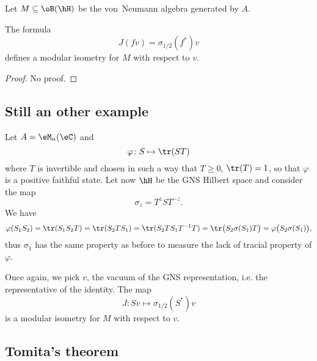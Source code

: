 Let $M\subseteq\oB(\hH)$ be the von~Neumann algebra generated by $A$.
\begin{proposition}
	The formula
	\begin{equation}
		J(fv)=\sigma_{1/2}(f^*)v
	\end{equation}
	defines a modular isometry for $M$ with respect to $v$.
\end{proposition}

\begin{proof}
No proof.
\end{proof}

					\subsection{Still an other example}

Let $A=\eM_n(\eC)$ and
\begin{equation}
	\varphi\colon S\mapsto \tr(ST)
\end{equation}
where $T$ is invertible and chosen in such a way that $T\geq0$, $\tr(T)=1$, so that $\varphi$ is a positive faithful state. Let now $\hH$ be the GNS Hilbert space and consider the map
\begin{equation}
	\sigma_z=T^zST^{-z}.
\end{equation}
We have
\begin{equation}
	\varphi(S_1S_2)=\tr(S_1S_2T)=\tr(S_2TS_1)=\tr(S_2TS_1T^{-1}T)=\tr\big( S_2\sigma(S_1)T \big)=\varphi\big( S_2\sigma(S_1) \big),
\end{equation}
thus $\sigma_1$ has the same property as before to measure the lack of tracial property of $\varphi$.

Once again, we pick $v$, the vacuum of the GNS representation, i.e. the representative of the identity. The map
\begin{equation}
	J\colon Sv\mapsto \sigma_{1/2}(S^*)v
\end{equation}
is a modular isometry for $M$ with respect to $v$.


					\subsection{Tomita's theorem}


